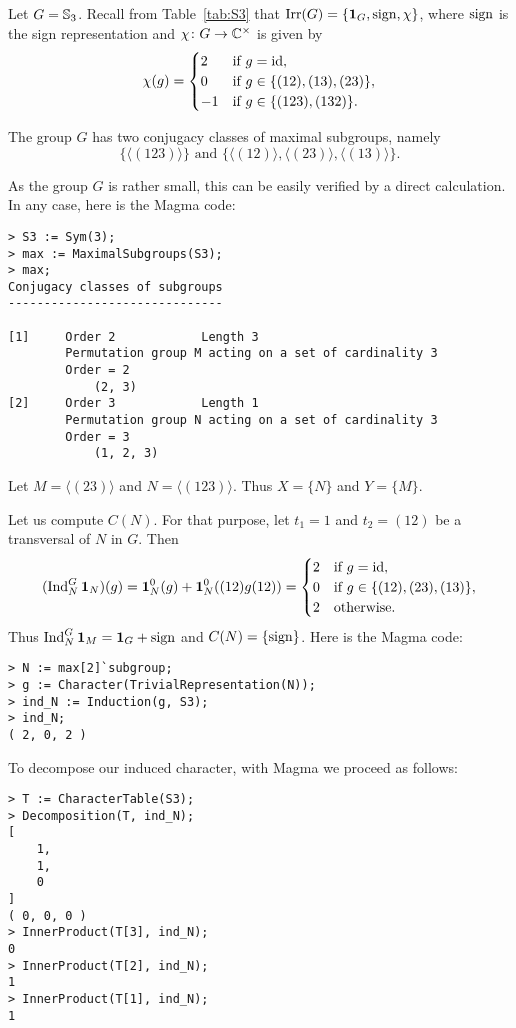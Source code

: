 \begin{example}
    Let $G=\mathbb{S}_3$. 
    Recall from Table~\ref{tab:S3} that $\operatorname{Irr}(G)=\{\mathbf{1}_G,\operatorname{sign},\chi\}$, where $\operatorname{sign}$ is the sign representation
    and $\chi\colon G\to\mathbb{C}^{\times}$ is given by
    \[
    \chi(g)=\begin{cases}
        2 & \text{if $g=\operatorname{id}$},\\
        0 & \text{if $g\in\{(12),(13),(23)\}$},\\
        -1 & \text{if $g\in\{(123),(132)\}.$}
    \end{cases}
    \]

    The group $G$ has two conjugacy classes of maximal subgroups, namely 
    \[
    \{\langle (123)\rangle\}\text{ and }\{\langle(12)\rangle,\langle(23)\rangle,\langle(13)\rangle\}.
    \]

    As the group $G$ is rather small, this can be easily verified 
    by a direct calculation. In any case, here is the Magma code:
    \begin{lstlisting}
> S3 := Sym(3);
> max := MaximalSubgroups(S3);
> max;
Conjugacy classes of subgroups
------------------------------

[1]     Order 2            Length 3
        Permutation group M acting on a set of cardinality 3
        Order = 2
            (2, 3)
[2]     Order 3            Length 1
        Permutation group N acting on a set of cardinality 3
        Order = 3
            (1, 2, 3)
    \end{lstlisting}

    Let $M=\langle (23)\rangle$ and $N=\langle (123)\rangle$. Thus $X=\{N\}$ and 
    $Y=\{M\}$. 
    
    Let us compute $C(N)$. For that purpose, let $t_1=1$ 
    and $t_2=(12)$ be a transversal of $N$ in $G$. Then 
    \[
    (\operatorname{Ind}_{N}^G\mathbf{1}_N)(g)=\mathbf{1}_N^0(g)+\mathbf{1}_N^0((12)g(12))=\begin{cases}
        2 & \text{if $g=\operatorname{id}$},\\
        0 & \text{if $g\in\{(12),(23),(13)\}$},\\
        2 & \text{otherwise.}
    \end{cases}
    \]
    Thus $\operatorname{Ind}_{N}^G\mathbf{1}_M=\mathbf{1}_G+\operatorname{sign}$ and $C(N)=\{\operatorname{sign}\}$. Here is the Magma code: 
\begin{lstlisting}
> N := max[2]`subgroup;
> g := Character(TrivialRepresentation(N));
> ind_N := Induction(g, S3);
> ind_N;
( 2, 0, 2 )
\end{lstlisting}    

To decompose our induced character, with Magma we proceed as follows:
\begin{lstlisting}
> T := CharacterTable(S3);
> Decomposition(T, ind_N);
[
    1,
    1,
    0
]
( 0, 0, 0 )
> InnerProduct(T[3], ind_N);
0
> InnerProduct(T[2], ind_N);
1
> InnerProduct(T[1], ind_N);
1
\end{lstlisting}



\end{example}
